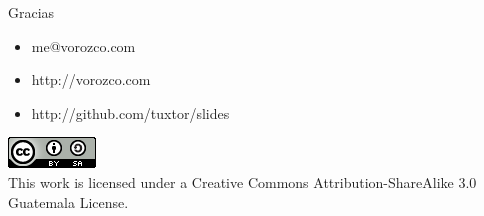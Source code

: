 \documentclass{beamer}
\begin{document}
\begin{frame}{Gracias}
\begin{itemize}
\item me@vorozco.com
\item http://vorozco.com
\item http://github.com/tuxtor/slides
\end{itemize}
\begin{center}
\includegraphics[width=0.1\linewidth]{Images/cclogo}
\\
This work is licensed under a Creative Commons Attribution-ShareAlike 3.0 Guatemala License.
\end{center}
\end{frame}
\end{document}
